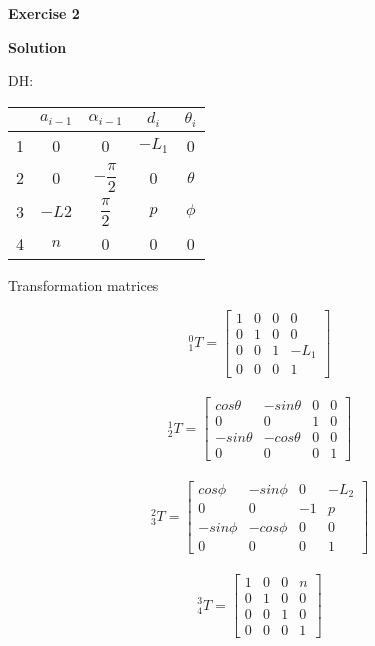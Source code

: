 \documentclass[12pt]{article}
\begin{document}
\newpage

\textbf{Exercise 2}	
\newpage	
		
\textbf{Solution}

DH:
\\
\begin{tabular}{|c|c|c|c|c|}
\hline
 & $a_{i-1}$ & $\alpha_{i-1}$ & $d_i$ & $\theta_i$ \\
 \hline
 1 & 0 & 0 & $-L_1$ & 0\\
 \hline
 2 & 0 & $-\dfrac{\pi}{2}$ & 0 & $\theta$\\
 \hline
 3 & $-L2$ & $\dfrac{\pi}{2}$ & $p$ & $\phi$\\
 \hline
 4 & $n$ & 0 & 0 & 0\\
 \hline
\end{tabular}


Transformation matrices

\[^0_{1}T=\left[
\begin{array}{cccc}
1 & 0 & 0 & 0 \\
0 & 1 & 0 & 0 \\
0 & 0 & 1 & -L_1\\
0 & 0 & 0 & 1
\end{array} \right]\]
\ 
\[^1_{2}T=\left[
\begin{array}{cccc}
cos\theta & -sin\theta & 0 & 0 \\
0 & 0 & 1 & 0\\
-sin\theta & -cos\theta & 0 & 0 \\
0 & 0 & 0 & 1
\end{array} \right]\]
\ 
\[^2_{3}T=\left[
\begin{array}{cccc}
cos\phi & -sin\phi & 0 & -L_2 \\
0 & 0 & -1 & p\\
-sin\phi & -cos\phi & 0 & 0 \\
0 & 0 & 0 & 1
\end{array} \right]\]
\ 
\[^3_{4}T=\left[
\begin{array}{cccc}
1 & 0 & 0 & n \\
0 & 1 & 0 & 0\\
0 & 0 & 1 & 0 \\
0 & 0 & 0 & 1
\end{array} \right]\]
\
\end{document}
